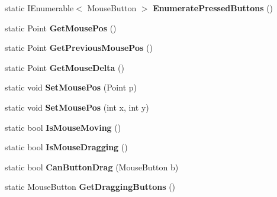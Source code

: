 \begin{DoxyCompactItemize}
static I\+Enumerable$<$ Mouse\+Button $>$ {\bfseries Enumerate\+Pressed\+Buttons} ()
\item 
\mbox{\label{class_n_g_sim_1_1_input_1_1_input_manager_af4ce857b1024364a6845e70c36b76fcd}} 
static Point {\bfseries Get\+Mouse\+Pos} ()
\item 
\mbox{\label{class_n_g_sim_1_1_input_1_1_input_manager_aeb7b2d5d0d52252d1dffe1db64d2670f}} 
static Point {\bfseries Get\+Previous\+Mouse\+Pos} ()
\item 
\mbox{\label{class_n_g_sim_1_1_input_1_1_input_manager_ab825e37264e337d7d3faa2c7c8dc9992}} 
static Point {\bfseries Get\+Mouse\+Delta} ()
\item 
\mbox{\label{class_n_g_sim_1_1_input_1_1_input_manager_a9ff114fb6a53a13e8425cf785c2e9fde}} 
static void {\bfseries Set\+Mouse\+Pos} (Point p)
\item 
\mbox{\label{class_n_g_sim_1_1_input_1_1_input_manager_a69a80a28dd2288c12b373d8ffe61e3c0}} 
static void {\bfseries Set\+Mouse\+Pos} (int x, int y)
\item 
\mbox{\label{class_n_g_sim_1_1_input_1_1_input_manager_ab603ebbc94fbf5788ddb16a706124187}} 
static bool {\bfseries Is\+Mouse\+Moving} ()
\item 
\mbox{\label{class_n_g_sim_1_1_input_1_1_input_manager_a5d01e2217257735d3f7435133fd7433f}} 
static bool {\bfseries Is\+Mouse\+Dragging} ()
\item 
\mbox{\label{class_n_g_sim_1_1_input_1_1_input_manager_ab5a681ff0678a5d60af12dfbd4bf4634}} 
static bool {\bfseries Can\+Button\+Drag} (Mouse\+Button b)
\item 
\mbox{\label{class_n_g_sim_1_1_input_1_1_input_manager_a1b2ed9c92af84660eb517508df81a2f9}} 
static Mouse\+Button {\bfseries Get\+Dragging\+Buttons} ()
\item 

\end{DoxyCompactItemize}
